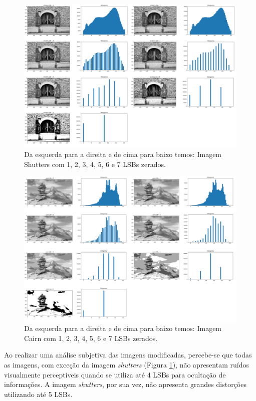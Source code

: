 \begin{figure}[h!]
    \includegraphics[width=1\linewidth]{Elementos//Figuras/shutters_lsb.png}
    \caption{Da esquerda para a direita e de cima para baixo temos: Imagem Shutters com 1, 2, 3, 4, 5, 6 e 7 LSBs zerados.}
    \label{fig:shutters-lsb}
\end{figure}

\begin{figure}[h!]
    \includegraphics[width=1\linewidth]{Elementos//Figuras/cairn_lsb.png}
    \caption{Da esquerda para a direita e de cima para baixo temos: Imagem Cairn com 1, 2, 3, 4, 5, 6 e 7 LSBs zerados.}
    \label{fig:cairn-lsb}
\end{figure}

Ao realizar uma análise subjetiva das imagens modificadas, percebe-se que todas as imagens, com exceção da imagem \textit{shutters} (Figura \ref{fig:shutters-lsb}), não apresentam ruídos visualmente perceptíveis quando se utiliza até 4 LSBs para ocultação de informações. A imagem \textit{shutters}, por sua vez, não apresenta grandes distorções utilizando até 5 LSBs.

